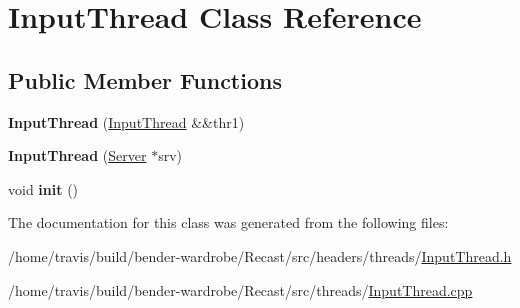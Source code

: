 \hypertarget{class_input_thread}{\section{Input\-Thread Class Reference}
\label{class_input_thread}
}
\subsection*{Public Member Functions}
\begin{DoxyCompactItemize}
\item 
\hypertarget{class_input_thread_a79ba754c063684c11485a951fac84e8b}{{\bfseries Input\-Thread} (\hyperlink{class_input_thread}{Input\-Thread} \&\&thr1)}\label{class_input_thread_a79ba754c063684c11485a951fac84e8b}

\item 
\hypertarget{class_input_thread_a486139cd9105ce017bcf930dc3e0747b}{{\bfseries Input\-Thread} (\hyperlink{class_server}{Server} $\ast$srv)}\label{class_input_thread_a486139cd9105ce017bcf930dc3e0747b}

\item 
\hypertarget{class_input_thread_ac33f0f934c6dc40c7747b96e8b60a736}{void {\bfseries init} ()}\label{class_input_thread_ac33f0f934c6dc40c7747b96e8b60a736}

\end{DoxyCompactItemize}


The documentation for this class was generated from the following files\-:\begin{DoxyCompactItemize}
\item 
/home/travis/build/bender-\/wardrobe/\-Recast/src/headers/threads/\hyperlink{_input_thread_8h}{Input\-Thread.\-h}\item 
/home/travis/build/bender-\/wardrobe/\-Recast/src/threads/\hyperlink{_input_thread_8cpp}{Input\-Thread.\-cpp}\end{DoxyCompactItemize}
